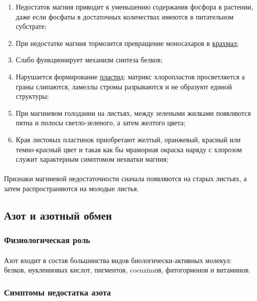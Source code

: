 \begin{enumerate}

	\item Недостаток магния приводит к уменьшению содержания фосфора в растении, даже если фосфаты в достаточных количествах имеются в питательном субстрате; 
	\item При недостатке магния тормозится превращение моносахаров в \hyperlink{krahmal}{крахмал};
	\item Слабо функционирует механизм синтеза белков;
	\item Нарушается формирование \hyperlink{cell_plastids}{пластид}: матрикс хлоропластов просветляется а граны слипаются, ламеллы стромы разрываются и не образуют единой структуры; 
	\item При магниевом голодании на листьях, между зелеными жилками появляются пятна и полосы светло-зеленого, а затем желтого цвета;
	\item Края листовых пластинок приобретают желтый, оранжевый, красный или темно-красный цвет и такая как бы мраморная окраска наряду с хлорозом служит характерным симптомом нехватки магния;

\end{enumerate}

\paragraph*{}Признаки магниевой недостаточности сначала появляются на старых листьях, а затем распространяются на молодые листья.

\subsection*{Азот и азотный обмен}

\subsubsection*{Физиологическая роль}

\paragraph*{}Азот входит в состав большинства видов биологически-активных молекул: белков, нуклеиновых кислот, пигментов, \gls{coenzim}ов, фитогормонов и витаминов. 

\subsubsection*{Симптомы недостатка азота}

